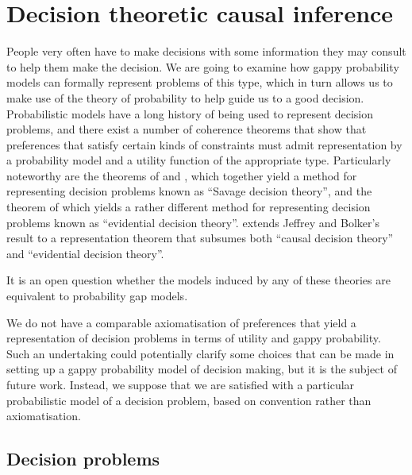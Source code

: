 
\section{Decision theoretic causal inference}\label{sec:seedo_models}

People very often have to make decisions with some information they may consult to help them make the decision. We are going to examine how gappy probability models can formally represent problems of this type, which in turn allows us to make use of the theory of probability to help guide us to a good decision. Probabilistic models have a long history of being used to represent decision problems, and there exist a number of coherence theorems that show that preferences that satisfy certain kinds of constraints must admit representation by a probability model and a utility function of the appropriate type. Particularly noteworthy are the theorems of \citet{ramsey_truth_2016} and \citet{savage_foundations_1954}, which together yield a method for representing decision problems known as ``Savage decision theory'', and the theorem of \citet{bolker_functions_1966,jeffrey_logic_1990} which yields a rather different method for representing decision problems known as ``evidential decision theory''. \citet{joyce_foundations_1999} extends Jeffrey and Bolker's result to a representation theorem that subsumes both ``causal decision theory'' and ``evidential decision theory''.

It is an open question whether the models induced by any of these theories are equivalent to probability gap models.

We do not have a comparable axiomatisation of preferences that yield a representation of decision problems in terms of utility and gappy probability. Such an undertaking could potentially clarify some choices that can be made in setting up a gappy probability model of decision making, but it is the subject of future work. Instead, we suppose that we are satisfied with a particular probabilistic model of a decision problem, based on convention rather than axiomatisation.

\subsection{Decision problems}

